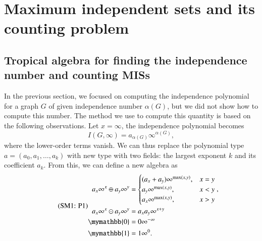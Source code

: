 \documentclass[onefignum, onetabnum]{siamart190516}
\newcommand{\eqname}[1]{\stepcounter{equation}\tag{\theequation : #1}}
\newcommand{\<}{\langle}
\renewcommand{\>}{\rangle}
\begin{document}
\section{Maximum independent sets and its counting problem}
\subsection{Tropical algebra for finding the independence number and counting MISs}
In the previous section, we focused on computing the independence polynomial for a graph $G$ of given independence number $\alpha(G)$, but we did not show how to compute this number.
The method we use to compute this quantity is based on the following observations. Let $x=\infty$, the independence polynomial becomes
\begin{equation}
I(G, \infty) = a_{\alpha(G)} \infty^{\alpha(G)},
\end{equation}
where the lower-order terms vanish. We can thus replace the polynomial type $a = (a_0, a_1, \ldots, a_k)$ with new type with two fields: the largest exponent $k$ and its coefficient $a_k$.
From this, we can define a new algebra as
\begin{equation}
    \eqname{P1}
\begin{split}
    a_x\infty^x \oplus a_y\infty^y &= \begin{cases}
        (a_x + a_y)\infty^{\max(x,y)}, & x = y\\
        a_y\infty^{\max(x,y)}, & x < y\\
        a_x\infty^{\max(x,y)}, & x > y
    \end{cases}, \\
    a_x\infty^x \odot a_y\infty^y &= a_x a_y\infty^{x+y}\\
    \mymathbb{0} &= 0\infty^{-\infty}\\
    \mymathbb{1} &= 1\infty^{0}.
\end{split}%
\label{eq:countingtropical}
\end{equation}
\end{document}
